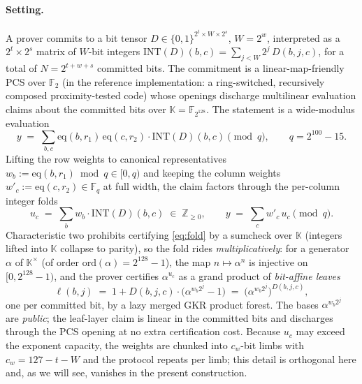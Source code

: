 \documentclass[11pt]{article}
\theoremstyle{definition}
\newcommand{\K}{\mathbb{K}}
\newcommand{\F}{\mathbb{F}}
\newcommand{\Z}{\mathbb{Z}}
\newcommand{\eq}{\mathrm{eq}}
\newcommand{\INT}{\mathrm{INT}}
\newcommand{\ord}{\mathrm{ord}}
\begin{document}
\paragraph{Setting.}
A prover commits to a bit tensor
$D\in\{0,1\}^{2^t\times W\times 2^s}$, $W=2^w$, interpreted as a
$2^t\times 2^s$ matrix of $W$-bit integers
$\INT(D)(b,c)=\sum_{j<W}2^j\,D(b,j,c)$, for a total of
$N=2^{t+w+s}$ committed bits. The commitment is a linear-map-friendly PCS
over $\F_2$ (in the reference implementation: a ring-switched, recursively
composed proximity-tested code) whose openings discharge multilinear
evaluation claims about the committed bits over $\K=\F_{2^{128}}$. The
statement is a wide-modulus evaluation
\[
y \;=\; \sum_{b,c} \eq(b,r_1)\,\eq(c,r_2)\cdot \INT(D)(b,c) \pmod q,
\qquad q = 2^{100}-15 .
\]
Lifting the row weights to canonical representatives
$w_b := \eq(b,r_1)\bmod q\in[0,q)$ and keeping the column weights
$w'_c:=\eq(c,r_2)\in\F_q$ at full width, the claim factors through the
per-column integer folds
\begin{equation}\label{eq:fold}
u_c \;=\; \sum_b w_b\cdot \INT(D)(b,c) \;\in\;\Z_{\ge 0},
\qquad
y \;=\; \sum_c w'_c\, u_c \pmod q .
\end{equation}
Characteristic two prohibits certifying \eqref{eq:fold} by a sumcheck over
$\K$ (integers lifted into $\K$ collapse to parity), so the fold rides
\emph{multiplicatively}: for a generator $\alpha$ of $\K^\times$
(of order $\ord(\alpha)=2^{128}-1$), the map $n\mapsto\alpha^n$ is
injective on $[0,2^{128}-1)$, and the prover certifies $\alpha^{u_c}$ as a
grand product of \emph{bit-affine leaves}
\[
\ell(b,j) \;=\; 1 + D(b,j,c)\cdot\bigl(\alpha^{w_b 2^j}-1\bigr)
\;=\; \bigl(\alpha^{w_b 2^j}\bigr)^{D(b,j,c)},
\]
one per committed bit, by a lazy merged GKR product forest. The bases
$\alpha^{w_b 2^j}$ are \emph{public}; the leaf-layer claim is linear in the
committed bits and discharges through the PCS opening at no extra
certification cost. Because $u_c$ may exceed the exponent capacity, the
weights are chunked into $c_w$-bit limbs with $c_w = 127-t-W$ and the
protocol repeats per limb; this detail is orthogonal here and, as we will
see, vanishes in the present construction.
\end{document}
